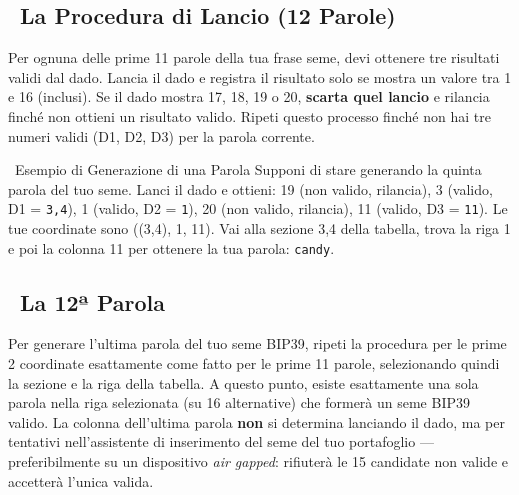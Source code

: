 \documentclass[10pt]{article}
\begin{document}
\subsection*{~La Procedura di Lancio (12 Parole)}

Per ognuna delle prime 11 parole della tua frase seme, devi ottenere tre risultati validi dal dado. Lancia il dado e registra il risultato solo se mostra un valore tra 1 e 16 (inclusi). Se il dado mostra 17, 18, 19 o 20, \textbf{scarta quel lancio} e rilancia finché non ottieni un risultato valido. Ripeti questo processo finché non hai tre numeri validi (D1, D2, D3) per la parola corrente.

\begin{examplebox}{\faLightbulb~Esempio di Generazione di una Parola}
Supponi di stare generando la quinta parola del tuo seme. Lanci il dado e ottieni: 19 (non valido, rilancia), 3 (valido, D1 = \texttt{3,4}), 1 (valido, D2 = \texttt{1}), 20 (non valido, rilancia), 11 (valido, D3 = \texttt{11}). Le tue coordinate sono ((3,4), 1, 11). Vai alla sezione 3,4 della tabella, trova la riga 1 e poi la colonna 11 per ottenere la tua parola: \texttt{candy}.
\end{examplebox}

\subsection*{\faPen~La 12ª Parola}

Per generare l'ultima parola del tuo seme BIP39, ripeti la procedura per le prime 2 coordinate esattamente come fatto per le prime 11 parole, selezionando quindi la sezione e la riga della tabella. A questo punto, esiste esattamente una sola parola nella riga selezionata (su 16 alternative) che formerà un seme BIP39 valido. La colonna dell'ultima parola \textbf{non} si determina lanciando il dado, ma per tentativi nell'assistente di inserimento del seme del tuo portafoglio --- preferibilmente su un dispositivo \textit{air gapped}: rifiuterà le 15 candidate non valide e accetterà l'unica valida.
\end{document}
